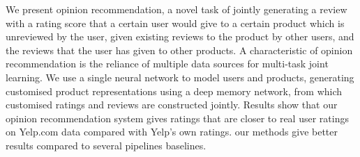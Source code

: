 We present opinion recommendation, a novel task of jointly generating a review with a rating score that a certain user would give to a certain product which is unreviewed by the user, given existing reviews to the product by other users, and the reviews that the user has given to other products. A characteristic of opinion recommendation is the reliance of multiple data sources for multi-task joint learning. We use a single neural network to model users and products, generating customised product representations using a deep memory network, from which customised ratings and reviews are constructed jointly. Results show that our opinion recommendation system gives ratings that are closer to real user ratings on Yelp.com data compared with Yelp's own ratings. our methods give better results compared to several pipelines baselines.
